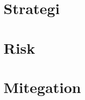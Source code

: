 \documentclass[a4paper]{article}
\begin{document}


\section{Strategi}

\section{Risk}

\section{Mitegation}
\end{document}
